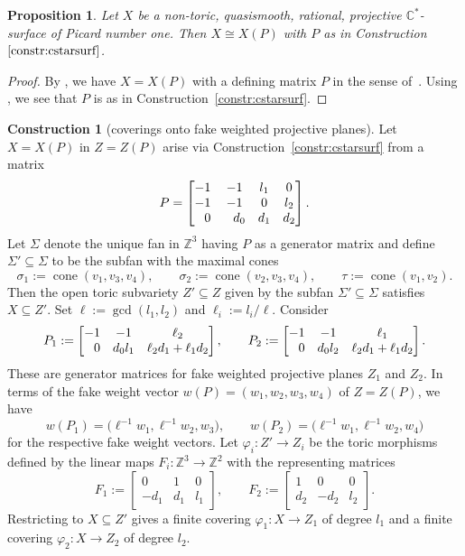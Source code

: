 \documentclass[pdftex]{sigma}
\newtheorem{prop}[thm]{Proposition}
\theoremstyle{definition}
\newtheorem{constr}[thm]{Construction}
\def\CC{{\mathbb C}}
\def\ZZ{{\mathbb Z}}
\DeclareMathOperator{\cone}{cone}
\begin{document}
\begin{prop}
\label{prop:allqs}
Let $X$ be a non-toric, quasismooth, rational, projective $\CC^*$-surface
of Picard number one.
Then $X \cong X(P)$ with $P$ as in Construction~$\ref{constr:cstarsurf}$.
\end{prop}


\begin{proof}
By \cite[Theorem~4.18]{HaHaHaSp}, we have $X=X(P)$ with a
defining matrix $P$ in the sense of~\cite[Construction~4.2]{HaHaHaSp}.
Using \cite[Propositions~4.9, 4.15 and~5.1]{HaHaHaSp}, we see that
$P$ is as in Construction~\ref{constr:cstarsurf}.
\end{proof}

\begin{constr}[coverings onto fake weighted projective planes]
\label{constr:covs}
Let $X \!=\! X(P)$ in ${Z\!=\!Z(P)}$ arise via
Construction~\ref{constr:cstarsurf} from
a matrix
\[
P
 =
\begin{bmatrix}
-1 & -1 & l_1 & 0
\\
-1 & -1 & 0 & l_2
\\
\hphantom{-}0 & \hphantom{-}d_0 & d_1 & d_2
\end{bmatrix}.
\]
Let $\Sigma$ denote the unique fan in $\ZZ^3$ having $P$
as a generator matrix
and define $\Sigma' \subseteq \Sigma$ to be the subfan
with the maximal cones
\[
\sigma_1 := \cone(v_1,v_3,v_4),
\qquad
\sigma_2 := \cone(v_2,v_3,v_4),
\qquad
\tau := \cone(v_1,v_2).
\]
Then the open toric subvariety $Z' \subseteq Z$ given
by the subfan $\Sigma' \subseteq \Sigma$ satisfies
$X \subseteq Z'$.
Set $\ell := \gcd(l_1,l_2)$ and $\ell_i := l_i/\ell$.
Consider
\[
P_1
 :=
\begin{bmatrix}
-1 & -1 & \ell_2
\\
\hphantom{-}0 & d_0l_1 & \ell_2d_1 + \ell_1d_2
\end{bmatrix},
\qquad
P_2
 :=
\begin{bmatrix}
-1 & -1 & \ell_1
\\
\hphantom{-}0 & d_0l_2 & \ell_2d_1 + \ell_1d_2
\end{bmatrix}.
\]
These are generator matrices for fake weighted
projective planes $Z_1$ and $Z_2$.
In terms of the fake weight vector
$w(P) = (w_1,w_2,w_3,w_4)$ of $Z=Z(P)$, we have
\[
w(P_1) = \bigl(\ell^{-1}w_1, \ell^{-1}w_2, w_3\bigr),
\qquad
w(P_2) = \bigl(\ell^{-1}w_1, \ell^{-1}w_2, w_4\bigr)
\]
for the respective fake weight vectors.
Let $\varphi_i \colon Z' \to Z_i$ be the toric
morphisms defined by the linear maps $
F_i \colon \ZZ^3 \to \ZZ^2$
with the representing matrices
\[
F_1
 :=
\begin{bmatrix}
 0 & 1 & 0
\\
-d_1 & d_1 & l_1
\end{bmatrix},
\qquad
F_2
 :=
\begin{bmatrix}
1 & 0 & 0
\\
d_2 & -d_2 & l_2
\end{bmatrix}.
\]
Restricting to $X \subseteq Z'$ gives a finite
covering $\varphi_1 \colon X \to Z_1$ of degree $l_1$
and a finite covering $\varphi_2 \colon X \to Z_2$
of degree $l_2$.
\end{constr}
\end{document}
